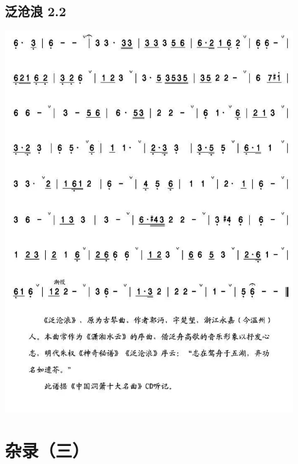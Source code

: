 \documentclass[cn,pad,twocol]{elegantbook}
\begin{document}
\section{泛沧浪 2.2}\includegraphics[width=0.95\textwidth]{dongxiao/20200819/泛沧浪-2.jpeg}
\chapter{杂录（三）}
\end{document}
